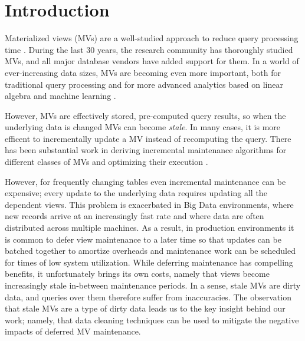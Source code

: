 \vspace{-0.5em}
\section{Introduction}
Materialized views (MVs) are a well-studied approach to reduce query processing time \cite{LarsonY85, gupta1995maintenance, chirkova2011materialized, halevy2001answering}.
During the last 30 years, the research community has thoroughly studied MVs, and all major database vendors have added support for them.
In a world of ever-increasing data sizes, MVs are becoming even more important, both for traditional query processing
 \cite{lefevre2014opportunistic, bailis2014scalable, perez2014history} and for more advanced analytics based on linear algebra and machine learning \cite{nikolic2014linview, zhang2014mat}.

However, MVs are effectively stored, pre-computed query results, so when the underlying data is changed MVs can become \emph{stale}. 
In many cases, it is more efficent to incrementally update a MV instead of recomputing the query.
There has been substantial work in deriving incremental maintenance algorithms for different classes of MVs and optimizing their execution \cite{gupta1995maintenance, DBLP:conf/sigmod/GriffinL95, griffin1997improved, samtani1999self, DBLP:conf/sac/TrutaC07, DBLP:journals/vldb/KochAKNNLS14, chirkova2011materialized}.

However, for frequently changing tables even incremental maintenance can be expensive; every update to the underlying data requires updating all the dependent views.  
This problem is exacerbated in Big Data environments, where new records arrive at an increasingly fast rate and where data are often 
distributed across multiple machines.  
As a result, in production environments it is common to defer view maintenance to a later time \cite{chirkova2011materialized, zhou2007lazy, DBLP:conf/sigmod/ColbyGLMT96} so that updates can be batched together to amortize overheads and maintenance work can be scheduled for times of low system utilization.  
While deferring maintenance has compelling benefits, it unfortunately brings its own costs, namely that views become increasingly stale in-between maintenance periods.   
In a sense, stale MVs are dirty data, and queries over them therefore suffer from inaccuracies.   
The observation that stale MVs are a type of dirty data leads us to the key insight behind our work; namely, that data cleaning techniques can be used to mitigate the negative impacts of deferred MV maintenance.  

